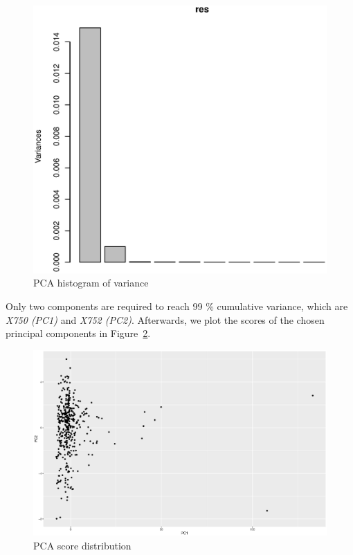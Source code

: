 \documentclass[a4paper,12pt]{article}
\begin{document}
    \begin{figure}[H]            \centering
    \caption{PCA histogram of variance}
    \label{fig:pcahist}
    \includegraphics[width=\textwidth]{figures/A2_pcahist.eps}
    \end{figure}

    Only two components are required to reach 99 \% cumulative variance, which are \emph{X750 (PC1)} and \emph{X752 (PC2)}. Afterwards, we plot the scores of the chosen principal components in Figure~\ref{fig:pcascore}.

    \begin{figure}[H]           
    \centering
    \caption{PCA score distribution}
    \label{fig:pcascore}
    \includegraphics[width=\textwidth]{figures/A2_pcascore.eps}
    \end{figure}
\end{document}
